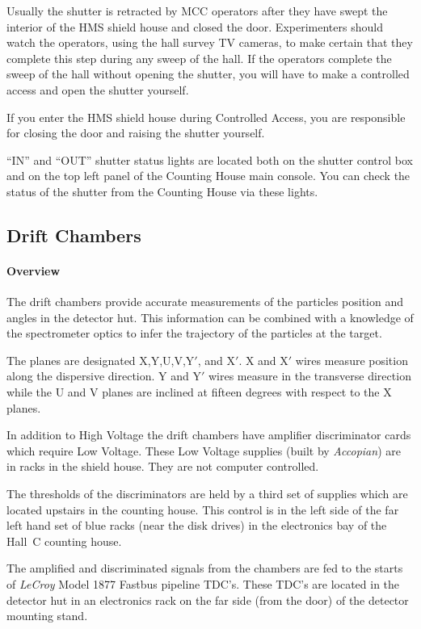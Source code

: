 Usually the shutter is retracted by MCC operators after they have
swept the interior of the HMS shield house and closed the
door. Experimenters should watch the operators, using the hall survey
TV cameras, to make certain that they complete this step during any
sweep of the hall. If the operators complete the sweep of the hall
without opening the shutter, you will have to make a controlled access
and open the shutter yourself.

If you enter the HMS shield house during Controlled Access, you are
responsible for closing the door and raising the shutter yourself.

``IN'' and ``OUT'' shutter status lights are located both on the
shutter control box and on the top left panel of the Counting House
main console. You can check the status of the shutter from the
Counting House via these lights.



\subsection{Drift Chambers}

\paragraph{Overview}

The drift chambers provide accurate measurements of the particles
position and angles in the detector hut. This information can be combined
with a knowledge of the spectrometer optics to infer the trajectory of the
particles at the target.

The planes are designated X,Y,U,V,Y$'$, and X$'$.
X and X$'$ wires measure position along the dispersive direction.
Y and Y$'$ wires measure in the transverse direction while
the U and V planes are inclined at fifteen degrees with respect to the
X planes.

In addition to High Voltage the drift chambers have amplifier discriminator
cards which require Low Voltage. These Low Voltage supplies
(built by {\em Accopian}) are
in racks in the shield house. They are not computer controlled.

The thresholds of the discriminators are held by a third set of supplies
which are located upstairs in the counting house. This control
is in the left side of the far left hand set of blue racks (near the disk drives) in the
electronics bay of the Hall~C counting house.

The amplified and discriminated signals from the chambers are fed
to the starts of {\em LeCroy} Model 1877 Fastbus pipeline TDC's. These
TDC's are located in the detector hut in an electronics rack on the
far side (from the door) of the detector mounting stand.

